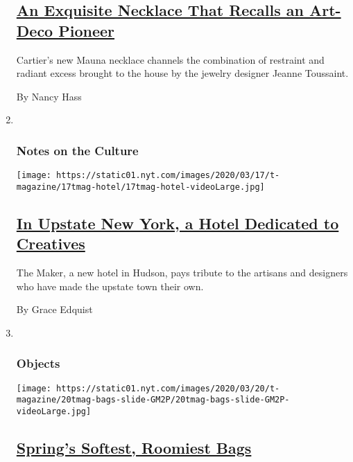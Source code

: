 \begin{enumerate}
  \hypertarget{an-exquisite-necklace-that-recalls-an-art-deco-pioneer}{%
  \subsection{\texorpdfstring{\href{/2020/03/16/t-magazine/cartier-mauna-necklace.html}{An
  Exquisite Necklace That Recalls an Art-Deco
  Pioneer}}{An Exquisite Necklace That Recalls an Art-Deco Pioneer}}\label{an-exquisite-necklace-that-recalls-an-art-deco-pioneer}}

  Cartier's new Mauna necklace channels the combination of restraint and
  radiant excess brought to the house by the jewelry designer Jeanne
  Toussaint.

  By Nancy Hass
\item ~
  \hypertarget{notes-on-the-culture-2}{%
  \subsubsection{Notes on the Culture}\label{notes-on-the-culture-2}}

  \texttt{[image: https://static01.nyt.com/images/2020/03/17/t-magazine/17tmag-hotel/17tmag-hotel-videoLarge.jpg]}

  \hypertarget{in-upstate-new-york-a-hotel-dedicated-to-creatives}{%
  \subsection{\texorpdfstring{\href{/2020/03/17/t-magazine/maker-hotel-hudson.html}{In
  Upstate New York, a Hotel Dedicated to
  Creatives}}{In Upstate New York, a Hotel Dedicated to Creatives}}\label{in-upstate-new-york-a-hotel-dedicated-to-creatives}}

  The Maker, a new hotel in Hudson, pays tribute to the artisans and
  designers who have made the upstate town their own.

  By Grace Edquist
\item ~
  \hypertarget{objects-1}{%
  \subsubsection{Objects}\label{objects-1}}

  \texttt{[image: https://static01.nyt.com/images/2020/03/20/t-magazine/20tmag-bags-slide-GM2P/20tmag-bags-slide-GM2P-videoLarge.jpg]}

  \hypertarget{springs-softest-roomiest-bags}{%
  \subsection{\texorpdfstring{\href{/2020/03/20/t-magazine/spring-bags.html}{Spring's
  Softest, Roomiest
  Bags}}{Spring's Softest, Roomiest Bags}}\label{springs-softest-roomiest-bags}}


\end{enumerate}
